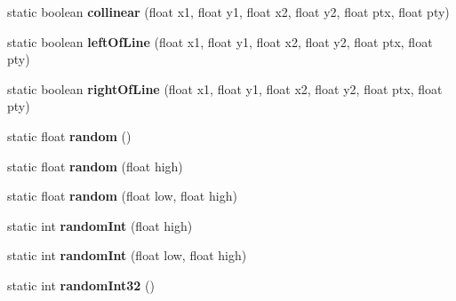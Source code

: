 \begin{DoxyCompactItemize}
\item 
\hypertarget{classhype_1_1util_1_1_h_math_aefc2b344f16a16f3ee4661db27e1c280}{static boolean {\bfseries collinear} (float x1, float y1, float x2, float y2, float ptx, float pty)}\label{classhype_1_1util_1_1_h_math_aefc2b344f16a16f3ee4661db27e1c280}

\item 
\hypertarget{classhype_1_1util_1_1_h_math_a1f06cdcb07fb30b543b7ac1cfbff615c}{static boolean {\bfseries left\-Of\-Line} (float x1, float y1, float x2, float y2, float ptx, float pty)}\label{classhype_1_1util_1_1_h_math_a1f06cdcb07fb30b543b7ac1cfbff615c}

\item 
\hypertarget{classhype_1_1util_1_1_h_math_aed97b073b226899b8c8750cf58a282ca}{static boolean {\bfseries right\-Of\-Line} (float x1, float y1, float x2, float y2, float ptx, float pty)}\label{classhype_1_1util_1_1_h_math_aed97b073b226899b8c8750cf58a282ca}

\item 
\hypertarget{classhype_1_1util_1_1_h_math_a8cb35fab331a42c739c6c0e80aaf55ca}{static float {\bfseries random} ()}\label{classhype_1_1util_1_1_h_math_a8cb35fab331a42c739c6c0e80aaf55ca}

\item 
\hypertarget{classhype_1_1util_1_1_h_math_a94e5bbc17665d441e0b8e99b3274f43a}{static float {\bfseries random} (float high)}\label{classhype_1_1util_1_1_h_math_a94e5bbc17665d441e0b8e99b3274f43a}

\item 
\hypertarget{classhype_1_1util_1_1_h_math_abb37edfce0e53b9863289eb78719de3a}{static float {\bfseries random} (float low, float high)}\label{classhype_1_1util_1_1_h_math_abb37edfce0e53b9863289eb78719de3a}

\item 
\hypertarget{classhype_1_1util_1_1_h_math_a6669ae4e870a7641edc06c5d1f51a5b9}{static int {\bfseries random\-Int} (float high)}\label{classhype_1_1util_1_1_h_math_a6669ae4e870a7641edc06c5d1f51a5b9}

\item 
\hypertarget{classhype_1_1util_1_1_h_math_a3145b6a9fe9e455970a3c6baba26093a}{static int {\bfseries random\-Int} (float low, float high)}\label{classhype_1_1util_1_1_h_math_a3145b6a9fe9e455970a3c6baba26093a}

\item 
\hypertarget{classhype_1_1util_1_1_h_math_a0bbeefb9f57d4341c5059687ad528682}{static int {\bfseries random\-Int32} ()}\label{classhype_1_1util_1_1_h_math_a0bbeefb9f57d4341c5059687ad528682}


\end{DoxyCompactItemize}
